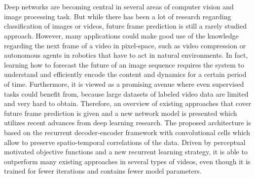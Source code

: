 \chapter{\abstractname}

Deep networks are becoming central in several areas of computer vision and image processing task. But while there has been a lot of research regarding classification of images or videos, future frame prediction is still a rarely studied approach. However, many applications could make good use of the knowledge regarding the next frame of a video in pixel-space, such as video compression or autonomous agents in robotics that have to act in natural environments. In fact, learning how to forecast the future of an image sequence requires the system to understand and efficiently encode the content and dynamics for a certain period of time. Furthermore, it is viewed as a promising avenue where even supervised tasks could benefit from, because large datasets of labeled video data are limited and very hard to obtain. Therefore, an overview of existing approaches that cover future frame prediction is given and a new network model is presented which utilizes recent advances from deep learning research. The proposed architecture is based on the recurrent decoder-encoder framework with convolutional cells which allow to preserve spatio-temporal correlations of the data. Driven by perceptual motivated objective functions and a new recurrent learning strategy, it is able to outperform many existing approaches in several types of videos, even though it is trained for fewer iterations and contains fewer model parameters.